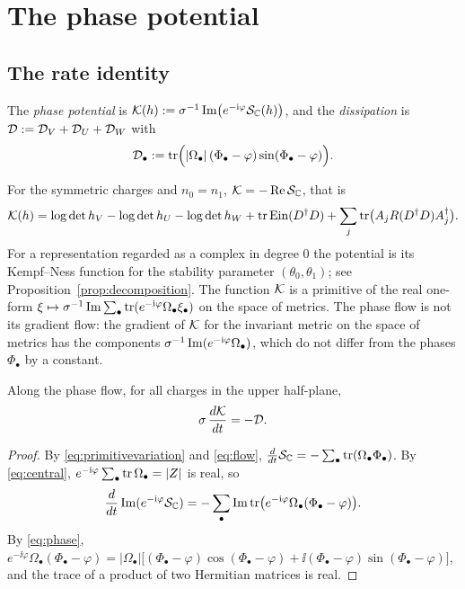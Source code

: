 \section{The phase potential}\label{sec:potential}

\subsection{The rate identity}

\begin{definition}\label{def:potential}
The \emph{phase potential} is
$\mathcal K(h):=\sigma^{-1}\operatorname{Im}\bigl(e^{-\mathrm i\varphi}\mathcal S_{\mathbb C}(h)\bigr)$, and the
\emph{dissipation} is $\mathcal D:=\mathcal D_V+\mathcal D_U+\mathcal D_W$ with
\[
 \mathcal D_\bullet:=\operatorname{tr}\Bigl(|\Omega_\bullet|\,(\Phi_\bullet-\varphi)\sin(\Phi_\bullet-\varphi)\Bigr).
\]
\end{definition}

For the symmetric charges and $n_0=n_1$, $\mathcal K=-\operatorname{Re}\mathcal S_{\mathbb C}$, that is
\begin{equation}\label{eq:Ksymmetric}
 \mathcal K(h)=\log\det h_V-\log\det h_U-\log\det h_W+\operatorname{tr}\operatorname{Ein}(D^\dagger D)
 +\sum_j\operatorname{tr}\bigl(A_jR(D^\dagger D)A_j^\dagger\bigr).
\end{equation}
For a representation regarded as a complex in degree $0$ the potential is its
Kempf--Ness function for the stability parameter $(\theta_0,\theta_1)$; see
Proposition~\ref{prop:decomposition}. The function $\mathcal K$ is a primitive of the
real one-form
$\xi\mapsto\sigma^{-1}\operatorname{Im}\sum_\bullet\operatorname{tr}(e^{-\mathrm i\varphi}\Omega_\bullet\xi_\bullet)$
on the space of metrics. The phase flow is not its gradient flow: the
gradient of $\mathcal K$ for the invariant metric on the space of metrics has the
components $\sigma^{-1}\operatorname{Im}(e^{-\mathrm i\varphi}\Omega_\bullet)$, which do not differ
from the phases $\Phi_\bullet$ by a constant.

\begin{proposition}\label{prop:rate}
Along the phase flow, for all charges in the upper half-plane,
\[
 \sigma\,\frac{d\mathcal K}{dt}=-\mathcal D .
\]
\end{proposition}

\begin{proof}
By \eqref{eq:primitivevariation} and \eqref{eq:flow},
$\frac d{dt}\mathcal S_{\mathbb C}=-\sum_\bullet\operatorname{tr}(\Omega_\bullet\Phi_\bullet)$. By
\eqref{eq:central}, $e^{-\mathrm i\varphi}\sum_\bullet\operatorname{tr}\Omega_\bullet=|Z|$ is real,
so
\[
 \frac d{dt}\operatorname{Im}(e^{-\mathrm i\varphi}\mathcal S_{\mathbb C})
 =-\sum_\bullet\operatorname{Im}\operatorname{tr}\bigl(e^{-\mathrm i\varphi}\Omega_\bullet(\Phi_\bullet-\varphi)\bigr).
\]
By \eqref{eq:phase},
$e^{-\ii\varphi}\Omega_\bullet(\Phi_\bullet-\varphi)
=|\Omega_\bullet|\bigl[(\Phi_\bullet-\varphi)\cos(\Phi_\bullet-\varphi)
+\ii(\Phi_\bullet-\varphi)\sin(\Phi_\bullet-\varphi)\bigr]$, and the trace of a
product of two Hermitian matrices is real.
\end{proof}

